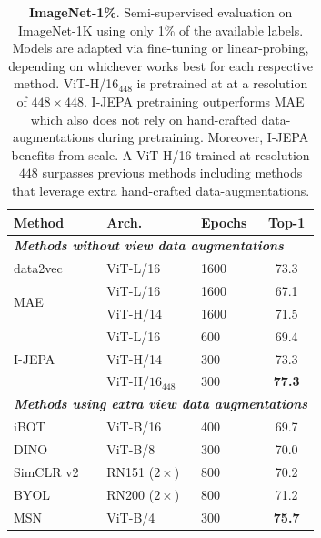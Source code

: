 \documentclass[10pt,twocolumn,letterpaper]{article}
\newcommand{\cc}{\cellcolor{fbApp}}
\newcommand{\putalg}{{I-JEPA}\xspace}
\begin{document}
\begin{table}[t]
    \centering
    \begin{tabular}{l l l c}
        \bf\small Method & \bf\small Arch. & \bf\small Epochs & \bf\small Top-1\\
        \toprule
        \multicolumn{4}{l}{\small\bf\it Methods without view data augmentations}\\
        \small data2vec~\cite{baevski2022data2vec} & \small ViT-L/16 & 1600& 73.3\\[1ex]
        \multirow{2}{*}{\small MAE~\cite{he2021masked}} & \small ViT-L/16 & 1600 & 67.1\\
        & \small ViT-H/14 & 1600 & 71.5\\[1ex]
        \multirow{3}{*}{\small \putalg} & \cc\small ViT-L/16 & \cc 600 & \cc 69.4\\
        & \cc\small ViT-H/14 & \cc 300 & \cc  73.3\\
        & \cc\small ViT-H/$16_{448}$ & \cc 300 & \cc \bf 77.3\\
        \midrule
        \multicolumn{4}{l}{\small\bf\it Methods using extra view data augmentations}\\
        \small iBOT~\cite{zhou2021ibotyes} & \small ViT-B/16 & 400 &  69.7\\
        \small DINO~\cite{caron2021emerging} & \small ViT-B/8 & 300 &  70.0 \\
        \small SimCLR v2~\cite{grill2020bootstrap} & \small RN151 ($2\times$) & 800 & 70.2 \\
        \small BYOL~\cite{grill2020bootstrap} & \small RN200 ($2\times$) & 800 & 71.2 \\
        \small MSN~\cite{assran2022masked} & \small ViT-B/4 & 300 &  \bf 75.7
    \end{tabular}
    \caption{{\bf ImageNet-1\%}. Semi-supervised evaluation on ImageNet-1K using only 1\% of the available labels. Models are adapted via fine-tuning or linear-probing, depending on whichever works best for each respective method. ViT-H/16$_{448}$ is pretrained at at a resolution of $448\times 448$. \putalg pretraining outperforms MAE which also does not rely on hand-crafted data-augmentations during pretraining. Moreover, \putalg benefits from scale. A ViT-H/16 trained at resolution $448$ surpasses previous methods including methods that leverage extra hand-crafted data-augmentations.}
    \label{tb:lowshot}
\end{table}
\end{document}
